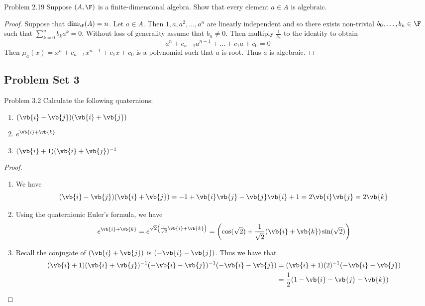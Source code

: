 \documentclass[a4paper]{article}
\begin{document}
\begin{ex}{Problem 2.19}{} Suppose $(A,\F)$ is a finite-dimensional algebra. Show that every element $a\in A$ is algebraic. \tcbline
\begin{proof}
Suppose that $\dim_\F(A)=n$. Let $a\in A$. Then $1,a,a^2,\dots,a^n$ are linearly independent and so there exists non-trivial $b_0,\dots,b_n\in\F$ such that $\sum_{k=0}^nb_ka^k=0$. Without loss of generality assume that $b_n\neq 0$. Then multiply $\frac{1}{b_n}$ to the identity to obtain $$a^n+c_{n-1}a^{n-1}+\dots+c_1a+c_0=0$$ Then $\mu_a(x)=x^n+c_{n-1}x^{n-1}+c_1x+c_0$ is a polynomial such that $a$ is root. Thus $a$ is algebraic. 
\end{proof}
\end{ex}

\subsection{Problem Set 3}
\begin{ex}{Problem 3.2}{} Calculate the following quaternions: 
\begin{enumerate}
\item $(\vb{i}-\vb{j})(\vb{i}+\vb{j})$
\item $e^{\vb{i}+\vb{k}}$
\item $(\vb{i}+1)(\vb{i}+\vb{j})^{-1}$
\end{enumerate} \tcbline
\begin{proof}~\\
\begin{enumerate}
\item We have $$(\vb{i}-\vb{j})(\vb{i}+\vb{j})=-1+\vb{i}\vb{j}-\vb{j}\vb{i}+1=2\vb{i}\vb{j}=2\vb{k}$$
\item Using the quaternionic Euler's formula, we have $$e^{\vb{i}+\vb{k}}=e^{\sqrt{2}\left(\frac{1}{\sqrt{2}}\vb{i}+\vb{k}\right)}=\left(\cos(\sqrt{2})+\frac{1}{\sqrt{2}}(\vb{i}+\vb{k})\sin(\sqrt{2})\right)$$
\item Recall the conjugate of $(\vb{i}+\vb{j})$ is $(-\vb{i}-\vb{j})$. Thus we have that 
\begin{align*}
(\vb{i}+1)(\vb{i}+\vb{j})^{-1}(-\vb{i}-\vb{j})^{-1}(-\vb{i}-\vb{j})&=(\vb{i}+1)(2)^{-1}(-\vb{i}-\vb{j})\\
&=\frac{1}{2}(1-\vb{i}-\vb{j}-\vb{k})
\end{align*}
\end{enumerate}
\end{proof}
\end{ex}
\end{document}
